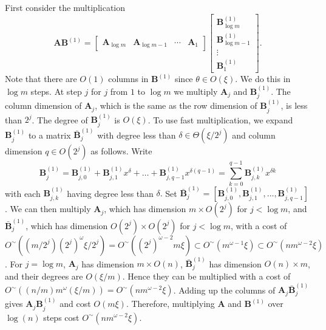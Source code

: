 \begin{pf}
First consider the multiplication 
\[
\mathbf{A}\mathbf{B}^{\left(1\right)}=\left[\begin{array}{cccc}
\mathbf{A}_{\log m} & \mathbf{A}_{\log m-1} & \cdots & \mathbf{A}_{1}\end{array}\right]\left[\begin{array}{l}
\mathbf{B}_{\log m}^{\left(1\right)}\\
\mathbf{B}_{\log m-1}^{\left(1\right)}\\
\vdots\\
\mathbf{B}_{1}^{\left(1\right)}
\end{array}\right].
\]
Note that there are $O\left(1\right)$ columns in $\mathbf{B}^{(1)}$
since $\theta\in O\left(\xi\right)$. We do this in $\log m$ steps.
At step $j$ for $j$ from $1$ to $\log m$ we multiply $\mathbf{A}_{j}$
and $\mathbf{B}_{j}^{(1)}$. The column dimension of $\mathbf{A}_{j}$,
which is the same as the row dimension of $\mathbf{B}_{j}^{(1)}$,
is less than $2^{j}$. The degree of $\mathbf{B}_{j}^{(1)}$ is $O\left(\xi\right)$.
To use fast multiplication, we expand $\mathbf{B}_{j}^{(1)}$ to a
matrix $\bar{\mathbf{B}}_{j}^{(1)}$ with degree less than $\delta\in\Theta(\xi/2^{j})$
and column dimension $q\in O(2^{j})$ as follows. Write 
\[
\mathbf{B}_{j}^{(1)}=\mathbf{B}_{j,0}^{(1)}+\mathbf{B}_{j,1}^{(1)}x^{\delta}+\dots+\mathbf{B}_{j,q-1}^{(1)}x^{\delta(q-1)}=\sum_{k=0}^{q-1}\mathbf{B}_{j,k}^{(1)}x^{\delta k}
\]
 with each $\mathbf{B}_{j,k}^{(1)}$ having degree less than $\delta.$
Set $\bar{\mathbf{B}}_{j}^{(1)}=\left[\mathbf{B}_{j,0}^{(1)},\mathbf{B}_{j,1}^{(1)},\dots,\mathbf{B}_{j,q-1}^{(1)}\right]$.
We can then multiply $\mathbf{A}_{j}$, which has dimension $m\times O(2^{j})$
for $j<\log m$, and $\bar{\mathbf{B}}_{j}^{(1)}$, which has dimension
$O(2^{j})\times O(2^{j})$ for $j<\log m$, with a cost of $O^{\sim}\left((m/2^{j})\left(2^{j}\right)^{\omega}\xi/2^{j}\right)=O^{\sim}\left(\left(2^{j}\right)^{\omega-2}m\xi\right)\subset O^{\sim}\left(m^{\omega-1}\xi\right)\subset O^{\sim}(nm^{\omega-2}\xi)$.
For $j=\log m$, $\mathbf{A}_{j}$ has dimension $m\times O\left(n\right)$,
$\bar{\mathbf{B}}_{j}^{\left(1\right)}$ has dimension $O\left(n\right)\times m$,
and their degrees are $O\left(\xi/m\right)$. Hence they can be multiplied
with a cost of $O^{\sim}\left((n/m)m^{\omega}(\xi/m)\right)=O^{\sim}\left(nm^{\omega-2}\xi\right)$.
Adding up the columns of $\mathbf{A}_{j}\bar{\mathbf{B}}_{j}^{(1)}$
gives $\mathbf{A}_{j}\mathbf{B}_{j}^{(1)}$ and cost $O(m\xi)$. Therefore,
multiplying $\mathbf{A}$ and $\mathbf{B}^{(1)}$ over $\log(n)$
steps cost $O^{\sim}\left(nm^{\omega-2}\xi\right)$. 


\end{pf}
